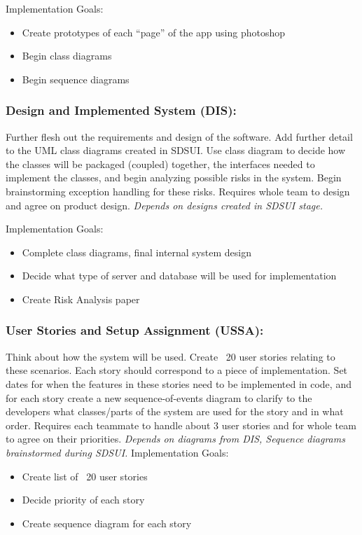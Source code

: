 \documentclass[12pt]{article}
\begin{document}
Implementation Goals:
\begin{itemize}
  \item Create prototypes of each “page” of the app using photoshop
  \item Begin class diagrams
  \item Begin sequence diagrams
\end{itemize}

\subsubsection{Design and Implemented System (DIS):}
Further flesh out the requirements and design of the software. Add further
detail to the UML class diagrams created in SDSUI. Use class diagram to decide
how the classes will be packaged (coupled) together, the interfaces needed to
implement the classes, and begin analyzing possible risks in the system. Begin
brainstorming exception handling for these risks. Requires whole team to design
and agree on product design. \textit{Depends on designs created in SDSUI stage.}

Implementation Goals:
\begin{itemize}
  \item Complete class diagrams, final internal system design
  \item Decide what type of server and database will be used for implementation
  \item Create Risk Analysis paper
\end{itemize}

\subsubsection{User Stories and Setup Assignment (USSA):}
Think about how the system will be used. Create ~20 user stories relating to
these scenarios. Each story should correspond to a piece of implementation. Set
dates for when the features in these stories need to be implemented in code, and
for each story create a new sequence-of-events diagram to clarify to the
developers what classes/parts of the system are used for the story and in what
order. Requires each teammate to handle about 3 user stories and for whole team
to agree on their priorities. \textit{Depends on diagrams from DIS, Sequence diagrams
brainstormed during SDSUI.}
Implementation Goals:
\begin{itemize}
  \item Create list of ~20 user stories
  \item Decide priority of each story
  \item Create sequence diagram for each story
\end{itemize}
\end{document}
